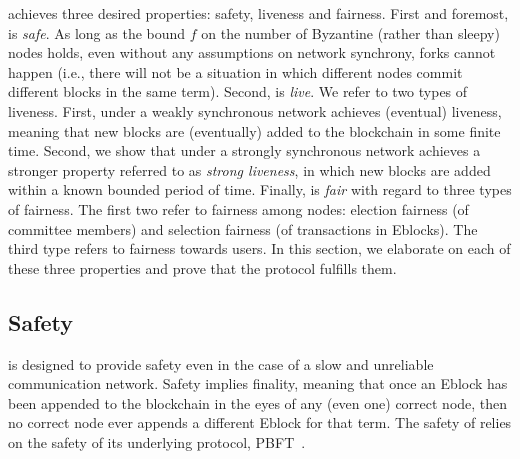 \name achieves three desired properties: safety, liveness and fairness. First and foremost, \name is \emph{safe}. As long as the bound $f$ on the number of Byzantine (rather than sleepy) nodes holds, even without any assumptions on network synchrony, forks cannot happen (i.e., there will not be a situation in which different nodes commit different blocks in the same term).
Second, \name is \emph{live}. We refer to two types of liveness. First, under a weakly synchronous network \name achieves (eventual) liveness, meaning that new blocks are (eventually) added to the blockchain in some finite time. Second, we show that under a strongly synchronous network \name achieves a stronger property referred to as \emph{strong liveness}, in which new blocks are added within a known bounded period of time.
Finally, \name is \emph{fair} with regard to three types of fairness. The first two refer to fairness among nodes: election fairness (of committee members) and selection fairness (of transactions in Eblocks). The third type refers to fairness towards users. In this section, we elaborate on each of these three properties and prove that the \name protocol fulfills them. %
\subsection{Safety}
\label{section_properties_safety}
\name is designed to provide safety even in the case of a slow and unreliable communication network. Safety implies finality, meaning that once an Eblock has been appended to the blockchain in the eyes of any (even one) correct node, then no correct node ever appends a different Eblock for that term. The safety of \name relies on the safety of its underlying protocol, PBFT~\cite{PBFT}.  

